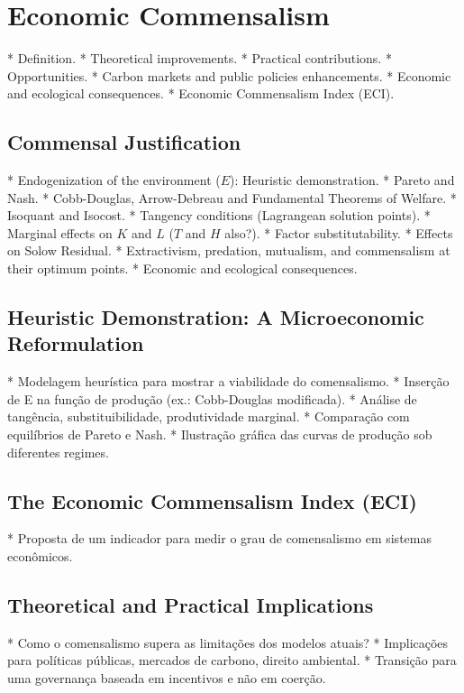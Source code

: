 \section{Economic Commensalism}

* Definition. * Theoretical improvements. * Practical contributions. * Opportunities. * Carbon markets and public policies enhancements. * Economic and ecological consequences. * Economic Commensalism Index (ECI).

\subsection{Commensal Justification}

* Endogenization of the environment (\(E\)): Heuristic demonstration. * Pareto and Nash. * Cobb-Douglas, Arrow-Debreau and Fundamental Theorems of Welfare. * Isoquant and Isocost. * Tangency conditions (Lagrangean solution points). * Marginal effects on \(K\) and \(L\) (\(T\) and \(H\) also?). * Factor substitutability. * Effects on Solow Residual. * Extractivism, predation, mutualism, and commensalism at their optimum points. * Economic and ecological consequences.

\subsection{Heuristic Demonstration: A Microeconomic Reformulation}

* Modelagem heurística para mostrar a viabilidade do comensalismo. * Inserção de E na função de produção (ex.: Cobb-Douglas modificada). * Análise de tangência, substituibilidade, produtividade marginal. * Comparação com equilíbrios de Pareto e Nash. * Ilustração gráfica das curvas de produção sob diferentes regimes.

\subsection{The Economic Commensalism Index (ECI)}

* Proposta de um indicador para medir o grau de comensalismo em sistemas econômicos.

\subsection{Theoretical and Practical Implications}

* Como o comensalismo supera as limitações dos modelos atuais? * Implicações para políticas públicas, mercados de carbono, direito ambiental. * Transição para uma governança baseada em incentivos e não em coerção.

